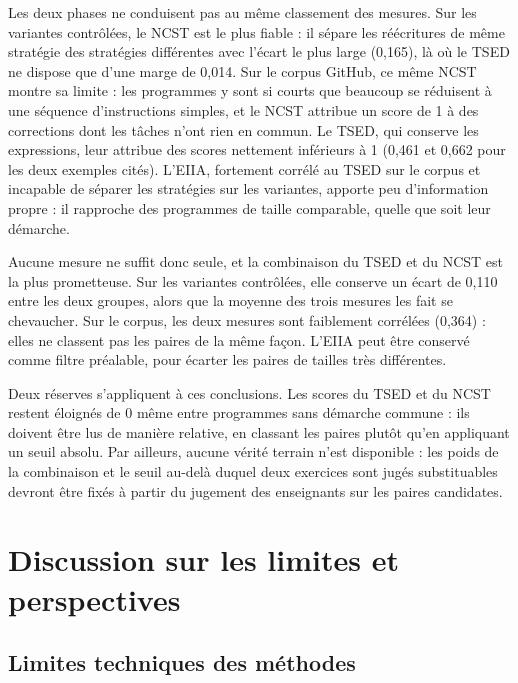 \documentclass[12pt,a4paper,oneside]{report}
\begin{document}
Les deux phases ne conduisent pas au même classement des mesures. Sur les
variantes contrôlées, le NCST est le plus fiable : il sépare les réécritures
de même stratégie des stratégies différentes avec l'écart le plus large
(0,165), là où le TSED ne dispose que d'une marge de 0,014. Sur le corpus
GitHub, ce même NCST montre sa limite : les programmes y sont si courts que
beaucoup se réduisent à une séquence d'instructions simples, et le NCST
attribue un score de 1 à des corrections dont les tâches n'ont rien en
commun. Le TSED, qui conserve les expressions, leur attribue des scores
nettement inférieurs à 1 (0,461 et 0,662 pour les deux exemples cités).
L'EIIA, fortement corrélé au TSED sur le corpus et incapable de séparer les
stratégies sur les variantes, apporte peu d'information propre : il
rapproche des programmes de taille comparable, quelle que soit leur
démarche.

Aucune mesure ne suffit donc seule, et la combinaison du TSED et du NCST est
la plus prometteuse. Sur les variantes contrôlées, elle conserve un écart de
0,110 entre les deux groupes, alors que la moyenne des trois mesures les
fait se chevaucher. Sur le corpus, les deux mesures sont faiblement
corrélées (0,364) : elles ne classent pas les paires de la même façon.
L'EIIA peut être conservé comme filtre préalable, pour écarter
les paires de tailles très différentes.

Deux réserves s'appliquent à ces conclusions. Les scores du TSED et du NCST
restent éloignés de 0 même entre programmes sans démarche commune : ils
doivent être lus de manière relative, en classant les paires plutôt qu'en
appliquant un seuil absolu. Par ailleurs, aucune vérité terrain n'est disponible : les poids de la
combinaison et le seuil au-delà duquel deux exercices sont jugés
substituables devront être fixés à partir du jugement des enseignants sur
les paires candidates.



\chapter{Discussion sur les limites et perspectives}
\section{Limites techniques des méthodes}
\end{document}
